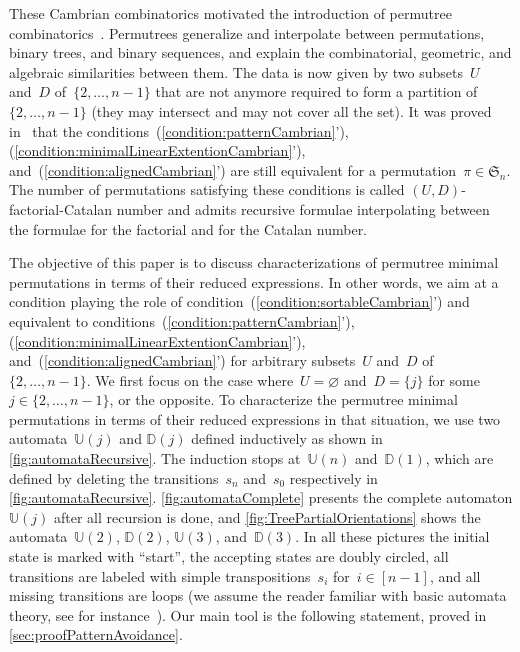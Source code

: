 \documentclass{amsart}
\newcommand{\fS}{\mathfrak{S}} %
\newcommand{\automatonU}{\mathbb{U}} %
\newcommand{\automatonD}{\mathbb{D}} %
\begin{document}
These Cambrian combinatorics motivated the introduction of permutree combinatorics~\cite{PilaudPons-permutrees}.
Permutrees generalize and interpolate between permutations, binary trees, and binary sequences, and explain the combinatorial, geometric, and algebraic similarities between them.
The data is now given by two subsets~$U$ and~$D$ of~$\{2, \dots, n-1\}$ that are not anymore required to form a partition of~$\{2, \dots, n-1\}$ (they may intersect and may not cover all the set).
It was proved in~\cite{PilaudPons-permutrees, ChatelPilaudPons} that the conditions~(\ref{condition:patternCambrian}'), (\ref{condition:minimalLinearExtentionCambrian}'), and~(\ref{condition:alignedCambrian}') are still equivalent for a permutation~$\pi \in \fS_n$.
The number of permutations satisfying these conditions is called $(U,D)$-factorial-Catalan number and admits recursive formulae interpolating between the formulae for the factorial and for the Catalan number.

The objective of this paper is to discuss characterizations of permutree minimal permutations in terms of their reduced expressions.
In other words, we aim at a condition playing the role of condition~(\ref{condition:sortableCambrian}') and equivalent to conditions~(\ref{condition:patternCambrian}'), (\ref{condition:minimalLinearExtentionCambrian}'), and~(\ref{condition:alignedCambrian}') for arbitrary subsets~$U$ and~$D$ of~$\{2, \dots, n-1\}$.
We first focus on the case where~$U = \varnothing$ and~$D = \{j\}$ for some~${j \in \{2, \dots, n-1\}}$, or the opposite.
To characterize the permutree minimal permutations in terms of their reduced expressions in that situation, we use two automata~$\automatonU(j)$ and $\automatonD(j)$ defined inductively as shown in \cref{fig:automataRecursive}.
The induction stops at~$\automatonU(n)$ and~$\automatonD(1)$, which are defined by deleting the transitions~$s_n$ and~$s_0$ respectively in \cref{fig:automataRecursive}.
\cref{fig:automataComplete} presents the complete automaton $\automatonU(j)$ after all recursion is done, and \cref{fig:TreePartialOrientations} shows the automata~$\automatonU(2)$, $\automatonD(2)$, $\automatonU(3)$, and~$\automatonD(3)$.
In all these pictures the initial state is marked with ``start'', the accepting states are doubly circled, all transitions are labeled with simple transpositions~$s_i$ for~$i \in [n-1]$, and all missing transitions are loops (we assume the reader familiar with basic automata theory, see for instance~\cite{HopcroftUllman}).
Our main tool is the following statement, proved in \cref{sec:proofPatternAvoidance}.
\end{document}
